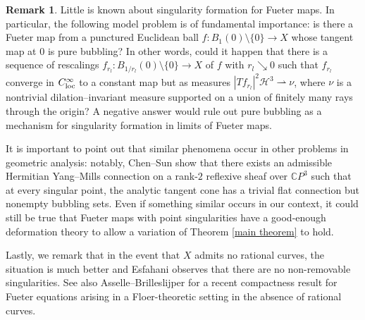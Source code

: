 \documentclass[11pt,a4paper]{article}
\theoremstyle{definition}
\newtheorem{rem}[theorem]{Remark}
\newcommand{\loc}{\textnormal{loc}}
\newcommand{\cH}{\mathcal{H}}
\newcommand{\bC}{\mathbb{C}}
\begin{document}
\begin{rem}
  Little is known about singularity formation for Fueter maps. In particular, the following model problem is of fundamental importance: is there a Fueter map from a punctured Euclidean ball $f: B_1(0) \setminus \{0\} \to X$ whose tangent map at $0$ is pure bubbling? In other words, could it happen that there is a sequence of rescalings $f_{r_l}: B_{1/r_l}(0) \setminus \{0\} \to X$ of $f$ with $r_l\searrow 0$ such that $f_{r_l}$ converge in $C^\infty_{\loc}$ to a constant map but as measures $|Tf_{r_l}|^2 \cH^3 \rightharpoonup \nu$, where $\nu$ is a nontrivial dilation--invariant measure supported on a union of finitely many rays through the origin? A negative answer would rule out pure bubbling as a mechanism for singularity formation in limits of Fueter maps.
  
  It is important to point out that similar phenomena occur in other problems in geometric analysis: notably, Chen--Sun \cite[Corollary 1.4]{ChenSun21Analytic} show that there exists an admissible Hermitian Yang--Mills connection on a rank-$2$ reflexive sheaf over $\bC P^3$ such that at every singular point, the analytic tangent cone has a trivial flat connection but nonempty bubbling sets. Even if something similar occurs in our context, it could still be true that Fueter maps with point singularities have a good-enough deformation theory to allow a variation of Theorem \ref{main theorem} to hold. 
  
  Lastly, we remark that in the event that $X$ admits no rational curves, the situation is much better and Esfahani \cite{Es23} observes that there are no non-removable singularities. See also Asselle--Brilleslijper \cite{AB26} for a recent compactness result for Fueter equations arising in a Floer-theoretic setting in the absence of rational curves.
\end{rem}
\end{document}
